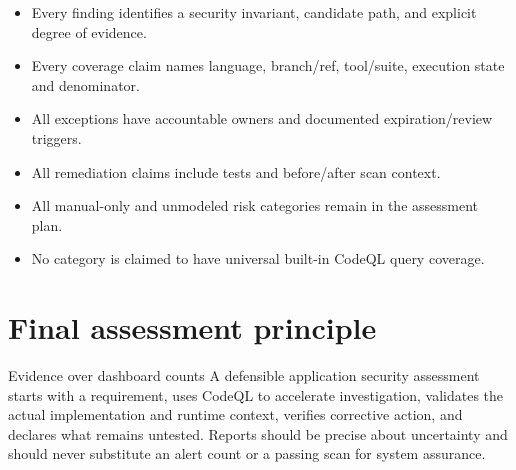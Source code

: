 \documentclass[11pt,letterpaper,oneside]{book}
\begin{document}
\begin{itemize}
\item Every finding identifies a security invariant, candidate path, and explicit degree of evidence.
\item Every coverage claim names language, branch/ref, tool/suite, execution state and denominator.
\item All exceptions have accountable owners and documented expiration/review triggers.
\item All remediation claims include tests and before/after scan context.
\item All manual-only and unmodeled risk categories remain in the assessment plan.
\item No category is claimed to have universal built-in CodeQL query coverage.
\end{itemize}

\backmatter\chapter*{Final assessment principle}
\begin{infobox}{Evidence over dashboard counts}
A defensible application security assessment starts with a requirement, uses CodeQL to accelerate investigation, validates the actual implementation and runtime context, verifies corrective action, and declares what remains untested. Reports should be precise about uncertainty and should never substitute an alert count or a passing scan for system assurance.
\end{infobox}
\end{document}
